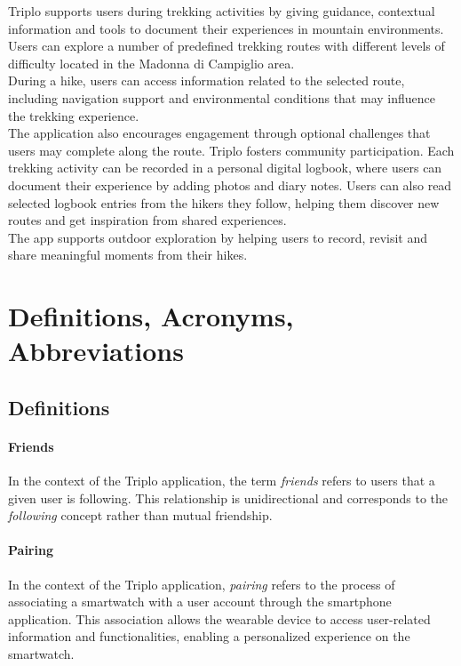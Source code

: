 Triplo supports users during trekking activities by giving guidance, contextual information and tools to document their experiences in mountain environments. \\
Users can explore a number of predefined trekking routes with different levels of difficulty located in the Madonna di Campiglio area. \\
During a hike, users can access information related to the selected route, including navigation support and environmental conditions that may influence the trekking experience.  \\
The application also encourages engagement through optional challenges that users may complete along the route.
Triplo fosters community participation. Each trekking activity can be recorded in a personal digital logbook, where users can document their experience by adding photos and diary notes. 
Users can also read selected logbook entries from the hikers they follow, helping them discover new routes and get inspiration from shared experiences.  \\
The app supports outdoor exploration by helping users to record, revisit and share meaningful moments from their hikes.








\section{Definitions, Acronyms, Abbreviations}

\subsection{Definitions}
\paragraph{Friends}
In the context of the Triplo application, the term \textit{friends} refers to users that a given user is following. This relationship is unidirectional and corresponds to the \textit{following} concept rather than mutual friendship.
\paragraph{Pairing}
In the context of the Triplo application, \textit{pairing} refers to the process of associating a smartwatch with a user account through the smartphone application. This association allows the wearable device to access user-related information and functionalities, enabling a personalized experience on the smartwatch.
